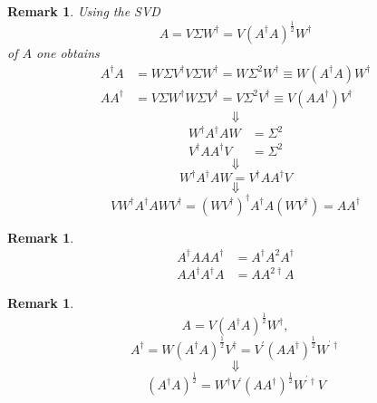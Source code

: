 \documentclass[aps,preprint]{revtex4}%
\newtheorem{remark}[theorem]{Remark}
\begin{document}
\begin{remark}
Using the SVD
\begin{equation}
A=V\Sigma W^{\dagger}=V\left(  A^{\dagger}A\right)  ^{\frac{1}{2}}W^{\dagger}%
\end{equation}
of $A$ one obtains
\begin{align}
A^{\dagger}A  &  =W\Sigma V^{\dagger}V\Sigma W^{\dagger}=W\Sigma^{2}%
W^{\dagger}\equiv W\left(  A^{\dagger}A\right)  W^{\dagger}\\
AA^{\dagger}  &  =V\Sigma W^{\dagger}W\Sigma V^{\dagger}=V\Sigma^{2}%
V^{\dagger}\equiv V\left(  AA^{\dagger}\right)  V^{\dagger}%
\end{align}%
\begin{equation}
\Downarrow
\end{equation}%
\begin{align}
W^{\dagger}A^{\dagger}AW  &  =\Sigma^{2}\\
V^{\dagger}AA^{\dagger}V  &  =\Sigma^{2}%
\end{align}%
\begin{equation}
\Downarrow
\end{equation}%
\begin{equation}
W^{\dagger}A^{\dagger}AW=V^{\dagger}AA^{\dagger}V
\end{equation}%
\begin{equation}
\Downarrow
\end{equation}%
\begin{equation}
VW^{\dagger}A^{\dagger}AWV^{\dagger}=\left(  WV^{\dagger}\right)  ^{\dagger
}A^{\dagger}A\left(  WV^{\dagger}\right)  =AA^{\dagger}%
\end{equation}

\end{remark}

\begin{remark}%
\begin{align}
A^{\dagger}AAA^{\dagger}  &  =A^{\dagger}A^{2}A^{\dagger}\\
AA^{\dagger}A^{\dagger}A  &  =AA^{2\dagger}A
\end{align}

\end{remark}

\begin{remark}%
\begin{equation}
A=V\left(  A^{\dagger}A\right)  ^{\frac{1}{2}}W^{\dagger},
\end{equation}%
\begin{equation}
A^{\dagger}=W\left(  A^{\dagger}A\right)  ^{\frac{1}{2}}V^{\dagger}=V^{\prime
}\left(  AA^{\dagger}\right)  ^{\frac{1}{2}}W^{^{\prime}\dagger}%
\end{equation}%
\begin{equation}
\Downarrow
\end{equation}%
\begin{equation}
\left(  A^{\dagger}A\right)  ^{\frac{1}{2}}=W^{\dagger}V^{\prime}\left(
AA^{\dagger}\right)  ^{\frac{1}{2}}W^{^{\prime}\dagger}V
\end{equation}

\end{remark}
\end{document}
